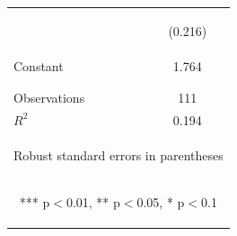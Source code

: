 \begin{center}
\begin{tabular}{lc}
\vspace{4pt} & \begin{footnotesize}(0.216)\end{footnotesize} \\
Constant & 1.764 \\
 & \begin{footnotesize}\end{footnotesize} \\
\vspace{4pt} & \begin{footnotesize}\end{footnotesize} \\
Observations & 111 \\
 $R^2$ & 0.194 \\ \hline
\multicolumn{2}{c}{\begin{footnotesize} Robust standard errors in parentheses\end{footnotesize}} \\
\multicolumn{2}{c}{\begin{footnotesize} *** p$<$0.01, ** p$<$0.05, * p$<$0.1\end{footnotesize}} \\
\end{tabular}
\end{center}
